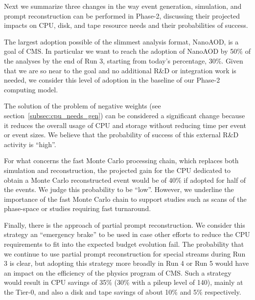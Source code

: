 \documentclass{cmspaper}
\begin{document}
Next we summarize three changes in the way event generation, simulation, and prompt reconstruction can be performed in Phase-2, discussing their projected impacts on CPU, disk, and tape resource needs and their probabilities of success.

The largest adoption possible of the slimmest analysis format, NanoAOD, is a goal of CMS. In particular we want to reach the adoption of NanoAOD by 50\% of the analyses by the end of Run 3, starting from today's percentage, 30\%. Given that we are so near to the goal and no additional R\&D or integration work is needed, we consider this level of adoption in the baseline of our Phase-2 computing model.

The solution of the problem of negative weights (see section~\ref{subsec:cpu_needs_gen}) can be considered a significant change %
because it reduces the overall usage of CPU and storage without reducing time per event or event sizes. We believe that the probability of success of this external R\&D activity is ``high''.

For what concerns the fast Monte Carlo processing chain, which replaces both simulation and reconstruction, the projected gain for the CPU dedicated to obtain a Monte Carlo reconstructed event would be of 40\% if adopted for half of the events. We judge this probability to be ``low''. However, we underline the importance of the fast Monte Carlo chain to support studies such as scans of the phase-space or studies requiring fast turnaround.

Finally, there is the approach of partial prompt reconstruction. We consider this strategy an ``emergency brake'' to be used in case other efforts to reduce the CPU requirements to fit into the expected budget evolution fail. 
The probability that we continue to use partial prompt reconstruction for special streams during Run 3 is clear, but adopting this strategy more broadly in Run 4 or Run 5 would have an impact on the efficiency of the physics program of CMS.
Such a strategy would result in CPU savings of 35\% (30\% with a pileup level of 140), mainly at the Tier-0, and also a disk and tape savings of about 10\% and 5\% respectively.
\end{document}
